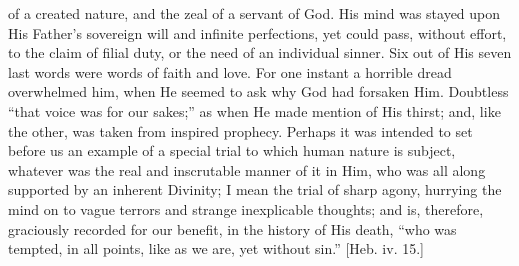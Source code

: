 of a created nature, and the zeal of a servant of God. His mind was
stayed upon His Father's sovereign will and infinite perfections, yet
could pass, without effort, to the claim of filial duty, or the need
of an individual sinner. Six out of His seven last words were words of
faith and love. For one instant a horrible dread overwhelmed him, when
He seemed to ask why God had forsaken Him. Doubtless ``that voice
was for our sakes;'' as when He made mention of His thirst; and,
like the other, was taken from inspired prophecy. Perhaps it was
intended to set before us an example of a special trial to which human
nature is subject, whatever was the real and inscrutable manner of it
in Him, who was all along supported by an inherent Divinity; I mean
the trial of sharp agony, hurrying the mind on to vague terrors and
strange inexplicable thoughts; and is, therefore, graciously recorded
for our benefit, in the history of His death, ``who was tempted,
in all points, like as we are, yet without sin.'' [Heb. iv. 15.]


